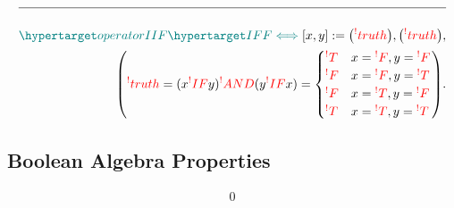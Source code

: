 \documentclass[a4paper]{article}
\def\ml{\mleft}
\def\mr{\mright}
\newcommand{\defeq}{:=}
\newcommand{\cusand}{,}
\newcommand{\cuspop}{.}
\newcommand{\n}{\\[1.5ex] \hline \nonumber \\[0ex]}
\newcommand{\m}{\nonumber \\}
\begin{document}
\begin{tcolorbox}
\begin{align}
\n \dfn{operatorIIF} [\dfn{IFF}[\iff]][x, y] \defeq \ml(\rfr{truth} [x][]\mr) \cusand \ml(\rfr{truth} [y][]\mr) \cusand 
\m \ml(\rfr{truth} [x \rfr{IFF} y][] = (x \rfr{IF} y) \rfr{AND} (y \rfr{IF} x) = \begin{cases} \rfr{T} & x = \rfr{F} \cusand y = \rfr{F} \\ \rfr{F} & x = \rfr{F} \cusand y = \rfr{T} \\ \rfr{F} & x = \rfr{T} \cusand y = \rfr{F} \\ \rfr{T} & x = \rfr{T} \cusand y = \rfr{T} \end{cases}\mr) \cuspop
\end{align}
\end{tcolorbox}

\subsection{Boolean Algebra Properties}
\begin{tcolorbox}
\begin{align}
0
\end{align}
\end{tcolorbox}
\end{document}

